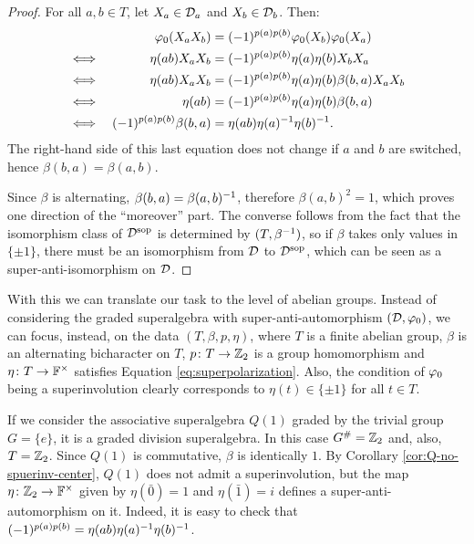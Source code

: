 \begin{proof}
    For all $a,b \in T$, let $X_a \in \mathcal{D}_a$ and $X_b\in \mathcal{D}_b$. Then:
    \begin{alignat*}{2}
        &&\varphi_0(X_a X_b) &= (-1)^{p(a) p(b)} \varphi_0(X_b) \varphi_0(X_a)\\
        \iff&&\,\, \eta(ab)X_a X_b &= (-1)^{p(a) p(b)} \eta(a) \eta(b) X_b X_a\\
        \iff&&\, \eta(ab)X_a X_b &= (-1)^{p(a) p(b)} \eta(a) \eta(b) \beta(b,a) X_a X_b\\
        \iff&& \eta(ab) &= (-1)^{p(a) p(b)} \eta(a) \eta(b) \beta(b,a)
        \\
        \iff&& (-1)^{p(a) p(b)} \beta(b, a) &=  \eta(ab) \eta(a)^{-1} \eta(b)^{-1}.
    \end{alignat*}
    The right-hand side of this last equation does not change if $a$ and $b$ are switched, hence $\beta(b,a) = \beta(a,b)$. 
    
    Since $\beta$ is alternating, $\beta(b, a) = \beta (a, b)^{-1}$, therefore $\beta(a,b)^2 = 1$, which proves one direction of the ``moreover'' part.
    The converse follows from the fact that the isomorphism class of $\mathcal{D}^{\mathrm{sop}}$ is determined by $(T, \beta^{-1})$, so if $\beta$ takes only values in $\{ \pm 1 \}$, there must be an isomorphism from $\mathcal{D}$ to $\mathcal{D}^{\mathrm{sop}}$, which can be seen as a super-anti-isomorphism on $\mathcal{D}$.
\end{proof}

With this we can translate our task to the level of abelian groups. 
Instead of considering the graded superalgebra with super-anti-automorphism $(\mathcal{D}, \varphi_0)$, we can focus, instead, on the data $(T, \beta, p, \eta)$, where $T$ is a finite abelian group, $\beta$ is an alternating bicharacter on $T$, $p\colon T \to \mathbb{Z}_2$ is a group homomorphism and $\eta\colon T \to \mathbb{F}^\times$ satisfies Equation \eqref{eq:superpolarization}. 
Also, the condition of $\varphi_0$ being a superinvolution clearly corresponds to $\eta(t) \in \{ \pm 1 \}$ for all $t\in T$.

\begin{ex}
    If we consider the associative superalgebra $Q(1)$ graded by the trivial group $G = \{e\}$, it is a graded division superalgebra. 
    In this case $G^\# = \mathbb{Z}_2$ and, also, $T = \mathbb{Z}_2$. 
    Since $Q(1)$ is commutative, $\beta$ is identically $1$.
    By Corollary \ref{cor:Q-no-spuerinv-center}, $Q(1)$ does not admit a superinvolution, but the map $\eta\colon \mathbb{Z}_2 \to \mathbb{F}^\times$ given by $\eta (\bar 0) = 1$ and $\eta( \bar 1) = i$ defines a super-anti-automorphism on it. 
    Indeed, it is easy to check that $(-1)^{p(a) p(b)} =  \eta(ab) \eta(a)^{-1} \eta(b)^{-1}$.
\end{ex}

